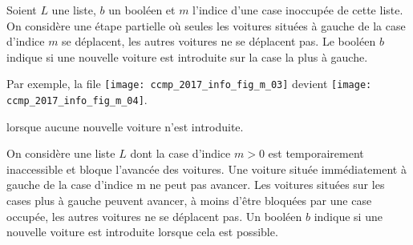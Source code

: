 \medskip




Soient $L$ une liste, $b$ un booléen et $m$ l'indice d'une case inoccupée de cette liste.
On considère une étape partielle où seules les voitures situées à gauche de la case d'indice $m$ se
déplacent, les autres voitures ne se déplacent pas. Le booléen $b$ indique si une nouvelle voiture est
introduite sur la case la plus à gauche.


Par exemple, la file \texttt{[image: ccmp\_2017\_info\_fig\_m\_03]}
 devient \texttt{[image: ccmp\_2017\_info\_fig\_m\_04]}.

\medskip

lorsque aucune nouvelle voiture n'est introduite.


On considère une liste $L$ dont la case d'indice $m > 0$ est temporairement inaccessible et
bloque l'avancée des voitures. Une voiture située immédiatement à gauche de la case d'indice m ne
peut pas avancer. Les voitures situées sur les cases plus à gauche peuvent avancer, à moins d'être
bloquées par une case occupée, les autres voitures ne se déplacent pas. Un booléen $b$ indique si une
nouvelle voiture est introduite lorsque cela est possible.

